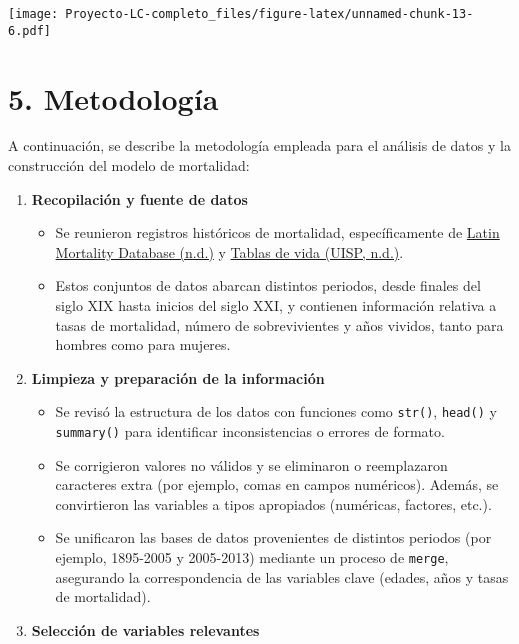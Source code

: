 \documentclass[
]{article}
\providecommand{\tightlist}{%
  \setlength{\itemsep}{0pt}\setlength{\parskip}{0pt}}
\begin{document}
\texttt{[image: Proyecto-LC-completo\_files/figure-latex/unnamed-chunk-13-6.pdf]}

\hypertarget{metodologuxeda}{%
\section{5. Metodología}\label{metodologuxeda}}

A continuación, se describe la metodología empleada para el análisis de
datos y la construcción del modelo de mortalidad:

\begin{enumerate}
\def\labelenumi{\arabic{enumi}.}
\tightlist
\item
  \textbf{Recopilación y fuente de datos}

  \begin{itemize}
  \tightlist
  \item
    Se reunieron registros históricos de mortalidad, específicamente de
    \href{https://www.ssc.wisc.edu/cdha/latinmortality2/?page_id=28}{Latin
    Mortality Database (n.d.)} y
    \href{https://uisp.insp.mx/wp/index.php/tablas-de-vida/}{Tablas de
    vida (UISP, n.d.)}.\\
  \item
    Estos conjuntos de datos abarcan distintos periodos, desde finales
    del siglo XIX hasta inicios del siglo XXI, y contienen información
    relativa a tasas de mortalidad, número de sobrevivientes y años
    vividos, tanto para hombres como para mujeres.
  \end{itemize}
\item
  \textbf{Limpieza y preparación de la información}

  \begin{itemize}
  \tightlist
  \item
    Se revisó la estructura de los datos con funciones como
    \texttt{str()}, \texttt{head()} y \texttt{summary()} para
    identificar inconsistencias o errores de formato.\\
  \item
    Se corrigieron valores no válidos y se eliminaron o reemplazaron
    caracteres extra (por ejemplo, comas en campos numéricos). Además,
    se convirtieron las variables a tipos apropiados (numéricas,
    factores, etc.).\\
  \item
    Se unificaron las bases de datos provenientes de distintos periodos
    (por ejemplo, 1895-2005 y 2005-2013) mediante un proceso de
    \texttt{merge}, asegurando la correspondencia de las variables clave
    (edades, años y tasas de mortalidad).
  \end{itemize}
\item
  \textbf{Selección de variables relevantes}


\end{enumerate}
\end{document}
